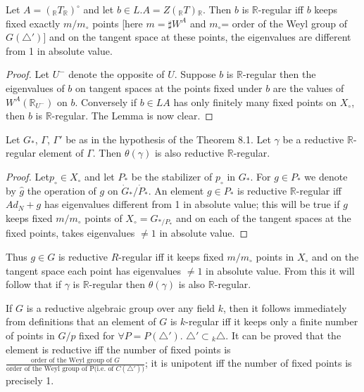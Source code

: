 \begin{lemma} \label{chap8:lem8.4}
  Let $A= ({}_\mathbb{R} T {}_\mathbb{R})^\circ$ and let $b \in L. A =
  Z({}_\mathbb{R} T){}_\mathbb{R}$. Then $b$ is $\mathbb{R}$-regular
  iff $b$ keeps fixed exactly $m/m_\circ$ points [here $m= \sharp W^A$
  and $m_\circ$= order of the Weyl group of $G(\triangle')$] and on
  the tangent space at these points, the eigenvalues are different
  from 1 in absolute value.
\end{lemma}

\begin{proof}
  Let $U^-$ denote the opposite of $U$. Suppose $b$ is
  $\mathbb{R}$-regular then the eigenvalues of $b$ on tangent spaces
  at the points fixed under $b$ are the values of $W^A
  (\mathbb{R}_{U^-})$ on $b$. Conversely if $b \in LA$ has only
  finitely many fixed points on $X_\circ$, then $b$ is
  $\mathbb{R}$-regular. The Lemma is now clear.
\end{proof}

\begin{lemma} \label{chap8:lem8.5}
  Let $G_*$, $\Gamma$, $\Gamma'$ be as in the hypothesis of the
  Theorem 8.1. Let $\gamma$ be a reductive $\mathbb{R}$-regular
  element of $\Gamma$. Then $\theta (\gamma)$ is also reductive
  $\mathbb{R}$-regular. 
\end{lemma}

\begin{proof}
  Let\pageoriginale $p_\circ \in X_\circ$ and let $P_*$ be the stabilizer of
  $p_\circ$ in $G_*$. For $g \in P_*$ we denote by $\hat{g}$ the
  operation of $g$ on $\dot{G}_*/ \dot{P}_*$. An element $g \in P_*$
  is reductive $\mathbb{R}$-regular iff $Ad_N+g$ has eigenvalues
  different from 1 in absolute value; this will be true if $g$ keeps
  fixed $m/m_\circ$ points of $X_\circ = G_{*/P_*}$ and on each of the
  tangent spaces at the fixed points, takes eigenvalues $\neq 1$ in
  absolute value.
\end{proof}

Thus $g \in G$ is reductive $R$-regular iff it keeps fixed $m/m_\circ$
points in $X_\circ$ and on the tangent space each point has
eigenvalues $\neq 1$ in absolute value. From this it will follow that
if $\gamma$ is $\mathbb{R}$-regular then $\theta (\gamma)$ is also
$\mathbb{R}$-regular. 

\begin{remark*}
  If $G$ is a reductive algebraic group over any field $k$, then it
  follows immediately from definitions that an element of $G$ is
  $k$-regular iff it keeps only a finite number of points in $G/p$
  fixed for $\forall P = P (\triangle')$. $\triangle' \subset {}_k
  \triangle$. It can be proved that the element is reductive iff the
  number of fixed points is $\frac{\text{order of the Weyl group of
      $G$}}{\text{order of the Weyl group of P(i.e. of
      $C(\triangle')$)}}$; it is unipotent iff the number of fixed
  points is precisely 1.
\end{remark*}

